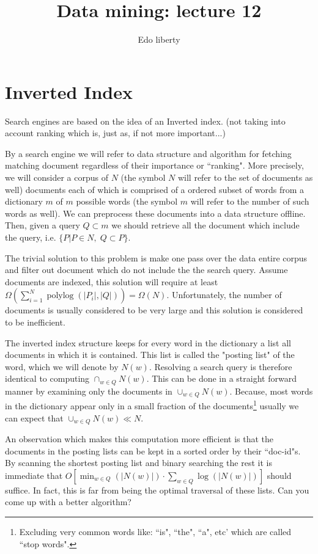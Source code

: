 \documentclass{article}
\title{Data mining: lecture 12} %
\author{Edo liberty}
\date{\nonumber}
\newcommand{\polylog}{\operatorname{polylog}}
\begin{document}
\maketitle

\section{Inverted Index}

Search engines are based on the idea of an Inverted index.
(not taking into account ranking which is, just as, if not more important...)


By a search engine we will refer to data structure and algorithm for fetching matching document regardless of their importance or ``ranking".
More precisely, we will consider a corpus of $N$ (the symbol $N$ will refer to the set of documents as well) 
documents each of which is comprised of a ordered subset of words from a dictionary $m$ of $m$ possible words (the symbol $m$ will refer to the number of such words as well).
We can preprocess these documents into a data structure offline. Then, given a query $Q \subset m$ we should retrieve all the document which include
the query, i.e. $\{P | P \in N , \; Q \subset P\}$.
 
The trivial solution to this problem is make one pass over the data entire corpus and filter out document which do not include the the search query.
Assume documents are indexed, this solution will require at least 
$\Omega(\sum_{i=1}^{N}\polylog(|P_i|,|Q|)) = \Omega(N)$.  
Unfortunately, the number of documents is usually considered to be very large and this solution is considered to be inefficient.  

The inverted index structure keeps for every word in the dictionary a list all documents in which it is contained.
This list is called the "posting list" of the word, which we will denote by $N(w)$.
Resolving a search query is therefore identical to computing $\cap_{w \in Q}N(w)$.
This can be done in a straight forward manner by examining only the documents in $\cup_{w \in Q}N(w)$.   
Because, most words in the dictionary appear only in a small fraction of the 
documents\footnote{Excluding very common words like: ``is", ``the", ``a", etc' which are called ``stop words".} 
usually we can expect that $\cup_{w \in Q}N(w) \ll N$.

An observation which makes this computation more efficient is that the documents in the posting lists can be kept in a
sorted order by their ``doc-id"s. By scanning the shortest posting list and binary searching the rest it is immediate that 
$O[\min_{w \in Q}(|N(w)|) \cdot \sum_{w \in Q}\log(|N(w)|)]$ should suffice. In fact, this is far from being the optimal traversal
of these lists. Can you come up with a better algorithm? 
\end{document}
